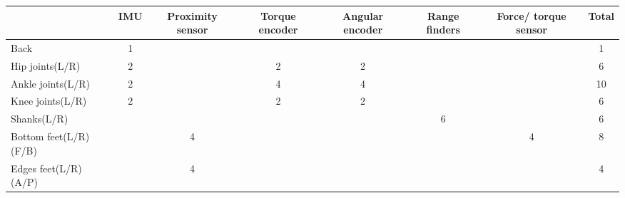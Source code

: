 \begin{table}
	\centering
	\begin{tabular}{|l|c|c|c|c|c|c|c|}
		\hline
		& \multicolumn{1}{l|}{IMU} & \multicolumn{1}{p{15mm}|}{Proximity sensor} & \multicolumn{1}{p{15mm}|}{Torque encoder} & \multicolumn{1}{p{15mm}|}{Angular encoder} & \multicolumn{1}{p{15mm}|}{Range finders} & \multicolumn{1}{p{15mm}|}{Force/ torque sensor} & \multicolumn{1}{l|}{Total} \\ \hline
		Back                  & 1                        &                                       &                                     &                                      &                                    &                                          & 1                          \\ \hline
		Hip joints(L/R)       & 2                        &                                       & 2                                   & 2                                    &                                    &                                          & 6                          \\ \hline
		Ankle joints(L/R)     & 2                        &                                       & 4                                   & 4                                    &                                    &                                          & 10                         \\ \hline
		Knee joints(L/R)      & 2                        &                                       & 2                                   & 2                                    &                                    &                                          & 6                          \\ \hline
		Shanks(L/R)           &                          &                                       &                                     &                                      & 6                                  &                                          & 6                          \\ \hline
		Bottom feet(L/R)(F/B) &                          & 4                                     &                                     &                                      &                                    & 4                                        & 8                          \\ \hline
		Edges feet(L/R)(A/P)  &                          & 4                                     &                                     &                                      &                                    &                                          & 4                          \\ \hline

\end{tabular}
\end{table}
